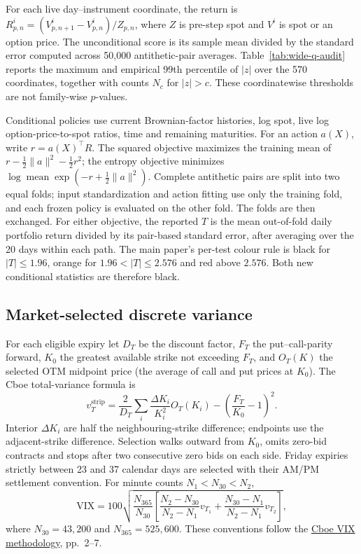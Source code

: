 For each live day--instrument coordinate, the return is
$R_{p,n}^i=(V_{p,n+1}^i-V_{p,n}^i)/Z_{p,n}$, where $Z$ is pre-step spot
and $V^i$ is spot or an option price. The unconditional score is its sample
mean divided by the standard error computed across 50,000 antithetic-pair
averages. Table~\ref{tab:wide-q-audit} reports the maximum and empirical
99th percentile of $|z|$ over the 570 coordinates, together with counts
$N_c$ for $|z|>c$. These coordinatewise thresholds are not family-wise
$p$-values.

Conditional policies use current Brownian-factor histories, log spot,
live log option-price-to-spot ratios, time and remaining maturities. For
an action $a(X)$, write $r=a(X)^\top R$. The squared objective maximizes
the training mean of $r-\tfrac12\lVert a\rVert^2-\tfrac12r^2$; the entropy
objective minimizes $\log\operatorname{mean}\exp(-r+\tfrac12\lVert a\rVert^2)$.
Complete antithetic pairs are split into two equal folds; input
standardization and action fitting use only the training fold, and each
frozen policy is evaluated on the other fold. The folds are then exchanged.
For either objective, the reported $T$ is the mean out-of-fold daily
portfolio return divided by its pair-based standard error, after averaging
over the 20 days within each path. The main paper's per-test colour rule is
black for $|T|\leq1.96$, orange for $1.96<|T|\leq2.576$ and red above
$2.576$. Both new conditional statistics are therefore black.

\subsection{Market-selected discrete variance}
For each eligible expiry let $D_T$ be the discount factor, $F_T$ the
put--call-parity forward, $K_0$ the greatest available strike not exceeding
$F_T$, and $O_T(K)$ the selected OTM midpoint price (the average of call
and put prices at $K_0$). The Cboe total-variance formula is
\begin{equation}\label{eq:wide-vix-strip}
  v_T^{\mathrm{strip}}
  =\frac{2}{D_T}\sum_i\frac{\Delta K_i}{K_i^2}O_T(K_i)
   -\left(\frac{F_T}{K_0}-1\right)^2.
\end{equation}
Interior $\Delta K_i$ are half the neighbouring-strike difference; endpoints
use the adjacent-strike difference. Selection walks outward from $K_0$,
omits zero-bid contracts and stops after two consecutive zero bids on each
side. Friday expiries strictly between 23 and 37 calendar days are selected
with their AM/PM settlement convention. For minute counts $N_1<N_{30}<N_2$,
\begin{equation}\label{eq:wide-vix-interpolation}
  \mathrm{VIX}
  =100\sqrt{\frac{N_{365}}{N_{30}}\left[
    \frac{N_2-N_{30}}{N_2-N_1}v_{T_1}
    +\frac{N_{30}-N_1}{N_2-N_1}v_{T_2}\right]},
\end{equation}
where $N_{30}=43,200$ and $N_{365}=525,600$.
These conventions follow the \href{https://cdn.cboe.com/resources/vix/VIX_Methodology.pdf}
{Cboe VIX methodology}, pp.~2--7.

